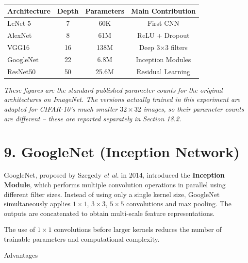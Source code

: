 \documentclass[11pt]{article}
\begin{document}
\begin{center}

\begin{tabular}{|l|c|c|c|}

\hline

Architecture &
Depth &
Parameters &
Main Contribution\\

\hline

LeNet-5 &
7 &
60K &
First CNN\\

AlexNet &
8 &
61M &
ReLU + Dropout\\

VGG16 &
16 &
138M &
Deep 3$\times3$ filters\\

GoogleNet &
22 &
6.8M &
Inception Modules\\

ResNet50 &
50 &
25.6M &
Residual Learning\\

\hline

\end{tabular}

\end{center}

\textit{These figures are the standard published parameter counts for the
original architectures on ImageNet. The versions actually trained in this
experiment are adapted for CIFAR-10's much smaller $32\times32$ images, so
their parameter counts are different -- these are reported separately in
Section 18.2.}

\section*{9. GoogleNet (Inception Network)}

GoogleNet, proposed by Szegedy \textit{et al.} in 2014, introduced the
\textbf{Inception Module}, which performs multiple convolution operations
in parallel using different filter sizes. Instead of using only a single
kernel size, GoogleNet simultaneously applies $1\times1$, $3\times3$,
$5\times5$ convolutions and max pooling. The outputs are concatenated to
obtain multi-scale feature representations.

The use of $1\times1$ convolutions before larger kernels reduces the
number of trainable parameters and computational complexity.


Advantages
\end{document}
